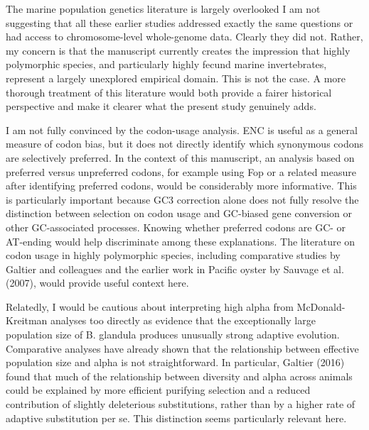 \begin{point}{The marine population genetics literature is largely overlooked}
I am not suggesting that all these earlier studies addressed exactly the
same questions or had access to chromosome-level whole-genome data.
Clearly they did not. Rather, my concern is that the manuscript currently
creates the impression that highly polymorphic species, and particularly
highly fecund marine invertebrates, represent a largely unexplored
empirical domain. This is not the case. A more thorough treatment of this
literature would both provide a fairer historical perspective and make it
clearer what the present study genuinely adds.
\end{point}




\begin{point}{} %
I am not fully convinced by the codon-usage analysis. ENC is useful as a
general measure of codon bias, but it does not directly identify which
synonymous codons are selectively preferred. In the context of this
manuscript, an analysis based on preferred versus unpreferred codons, for
example using Fop or a related measure after identifying preferred
codons, would be considerably more informative. This is particularly
important because GC3 correction alone does not fully resolve the
distinction between selection on codon usage and GC-biased gene
conversion or other GC-associated processes. Knowing whether preferred
codons are GC- or AT-ending would help discriminate among these
explanations. The literature on codon usage in highly polymorphic
species, including comparative studies by Galtier and colleagues and the
earlier work in Pacific oyster by Sauvage et al. (2007), would provide
useful context here.
\end{point}


\begin{point}{} %
Relatedly, I would be cautious about interpreting high alpha from
McDonald-Kreitman analyses too directly as evidence that the
exceptionally large population size of B. glandula produces unusually
strong adaptive evolution. Comparative analyses have already shown that
the relationship between effective population size and alpha is not
straightforward. In particular, Galtier (2016) found that much of the
relationship between diversity and alpha across animals could be
explained by more efficient purifying selection and a reduced
contribution of slightly deleterious substitutions, rather than by a
higher rate of adaptive substitution per se. This distinction seems
particularly relevant here.
\end{point}

